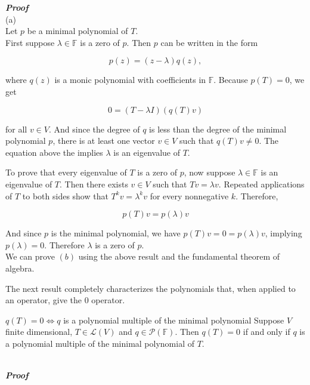 \documentclass[svgnames]{article}     %
\begin{document}
\textbf{\textit{Proof}}  \\

(a) \\ 
Let $p$ be a minimal polynomial of $T$. \\

First suppose $\lambda \in \mathbb{F}  $ is a zero of $p$. Then $p$ can be
written in the form 

\[
p(z) = (z - \lambda)q(z), 
\] \vspace{3px}

where $q(z)$ is a monic polynomial with coefficients in $\mathbb{F}  $. Because
$p(T) = 0$, we get 

\[
0 = (T - \lambda I )(q(T) v) 
\] \vspace{3px}

for all $v\in V$. And since the degree of $q$ is less than the degree of the
minimal polynomial $p$, there is at least one vector $v \in V$ such that
$q(T)v \neq 0$. The equation above the implies $\lambda$ is an eigenvalue of
$T$. 

To prove that every eigenvalue of $T$ is a zero of $p$, now suppose $\lambda
\in \mathbb{F}  $ is an eigenvalue of $T$. Then there exists $v\in V$ such that
$Tv  = \lambda v$. Repeated applications of $T$ to both sides show that $T^k
v = \lambda^k v$ for every nonnegative $k$. Therefore, 

\[
p(T) v = p(\lambda) v
\] \vspace{3px}

And since $p$ is the minimal polynomial, we have $p(T) v = 0 = p(\lambda)v$,
implying $p(\lambda) = 0$. Therefore $\lambda$ is a zero of $p$. \\

We can prove $(b)$ using the above result and the fundamental theorem of
algebra. 

The next result completely characterizes the polynomials that, when applied to
an operator, give the 0 operator.  

\begin{mainbox}{$q(T) = 0\Leftrightarrow q$ is a polynomial multiple of the
  minimal polynomial}
  Suppose $ V$ finite dimensional, $T \in \mathcal{L} (V)$ and $q \in
  \mathcal{P} (\mathbb{F} ) $. Then $q(T) = 0$ if and only if $q$ is
  a polynomial multiple of the minimal polynomial of $T$. 
\end{mainbox} \mbox{} \\

\textbf{\textit{Proof}}\\
\end{document}
